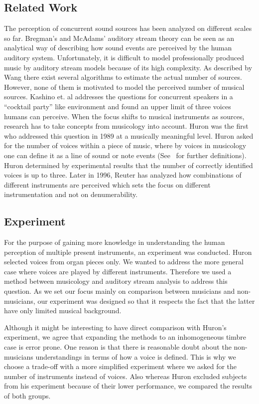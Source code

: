 \subsection{Related Work}
The perception of concurrent sound sources has been analyzed on different scales so far. Bregman's and McAdams' \cite{mcadams79} auditory stream theory can be seen as an analytical way of describing how sound events are perceived by the human auditory system. Unfortunately, it is difficult to model professionally produced music by auditory stream models because of its high complexity. As described by Wang \cite{wang2006} there exist several algorithms to estimate the actual number of sources. However, none of them is motivated to model the perceived number of musical sources. Kashino et. al \cite{kashino1995} addresses the questions for concurrent speakers in a ``cocktail party'' like environment and found an upper limit of three voices humans can perceive. When the focus shifts to musical instruments as sources, research has to take concepts from musicology into account. Huron \cite{huron89} was the first who addressed this question in 1989 at a musically meaningful level. Huron asked for the number of voices within a piece of music, where by voices in musicology one can define it as a line of sound or note events (See~\cite{Cambouropoulos2008} for further definitions). Huron determined by experimental results that the number of correctly identified voices is up to three. Later in 1996, Reuter \cite{reuter96} has analyzed how combinations of different instruments are perceived which sets the focus on different instrumentation and not on denumerability.

\subsection{Experiment}
For the purpose of gaining more knowledge in understanding the human perception of multiple present instruments, an experiment was conducted. Huron selected voices from organ pieces only. We wanted to address the more general case where voices are played by different instruments. Therefore we used a method between musicology and auditory stream analysis to address this question. As we set our focus mainly on comparison between musicians and non-musicians, our experiment was designed so that it respects the fact that the latter have only limited musical background.

Although it might be interesting to have direct comparison with Huron's experiment, we agree that expanding the methods to an inhomogeneous timbre case is error prone. One reason is that there is reasonable doubt about the non-musicians understandings in terms of how a voice is defined. This is why we choose a trade-off with a more simplified experiment where we asked for the number of instruments instead of voices. Also whereas Huron \cite{huron89}  excluded subjects from his experiment because of their lower performance, we compared the results of both groups.

